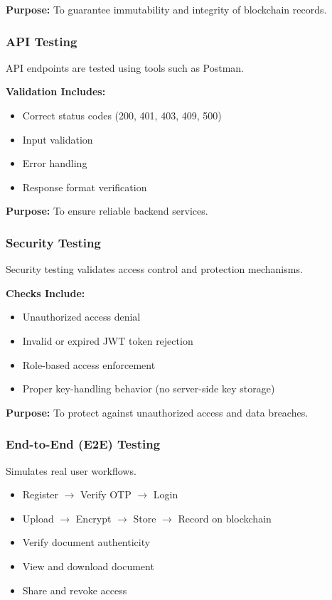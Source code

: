 \documentclass[12pt]{article}
\begin{document}
\textbf{Purpose:}  
To guarantee immutability and integrity of blockchain records.

\subsubsection{API Testing}

API endpoints are tested using tools such as Postman.

\textbf{Validation Includes:}
\begin{itemize}
\item Correct status codes (200, 401, 403, 409, 500)
\item Input validation
\item Error handling
\item Response format verification
\end{itemize}

\textbf{Purpose:}  
To ensure reliable backend services.

\subsubsection{Security Testing}

Security testing validates access control and protection mechanisms.

\textbf{Checks Include:}
\begin{itemize}
\item Unauthorized access denial
\item Invalid or expired JWT token rejection
\item Role-based access enforcement
\item Proper key-handling behavior (no server-side key storage)
\end{itemize}

\textbf{Purpose:}  
To protect against unauthorized access and data breaches.

\subsubsection{End-to-End (E2E) Testing}

Simulates real user workflows.

\begin{itemize}
\item Register $\rightarrow$ Verify OTP $\rightarrow$ Login
\item Upload $\rightarrow$ Encrypt $\rightarrow$ Store $\rightarrow$ Record on blockchain
\item Verify document authenticity
\item View and download document
\item Share and revoke access
\end{itemize}
\end{document}
